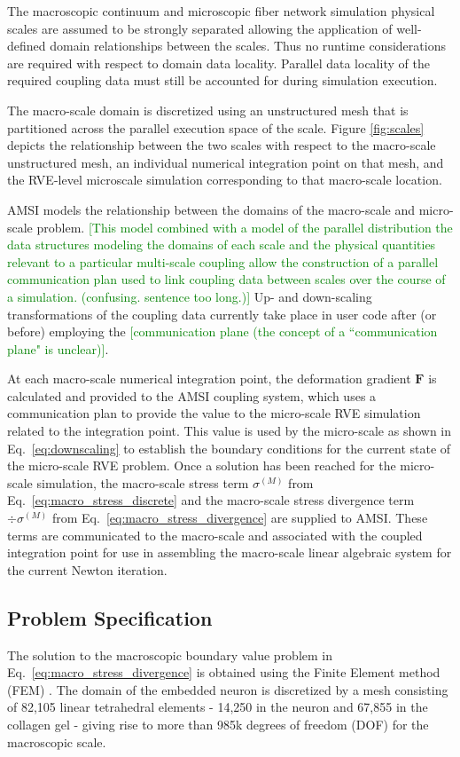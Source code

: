 \documentclass[]{interact}
\newcommand{\green}[1]{\textcolor{green}{[#1]}}
\begin{document}
The macroscopic continuum and microscopic fiber network simulation physical scales are assumed to be strongly separated allowing the application of well-defined domain relationships between the scales. Thus no runtime considerations are required with respect to domain data locality. Parallel data locality of the required coupling data must still be accounted for during simulation execution.

The macro-scale domain is discretized using an unstructured mesh that is partitioned across the parallel execution space of the scale. Figure \ref{fig:scales} depicts the relationship between the two scales with respect to the macro-scale unstructured mesh, an individual numerical integration point on that mesh, and the RVE-level microscale simulation corresponding to that macro-scale location.

AMSI models the relationship between the domains of the macro-scale and micro-scale problem. \green{This model combined with a model of the parallel distribution the data structures modeling the domains of each scale and the physical quantities relevant to a particular multi-scale coupling allow the construction of a parallel communication plan used to link coupling data between scales over the course of a simulation. (confusing. sentence too long.)} Up- and down-scaling transformations of the coupling data currently take place in user code after (or before) employing the \green{communication plane (the concept of a ``communication plane" is unclear)}.

At each macro-scale numerical integration point, the deformation gradient $\pmb{F}$ is calculated and provided to the AMSI coupling system, which uses a communication plan to provide the value to the micro-scale RVE simulation related to the integration point. This value is used by the micro-scale as shown in Eq.\ \eqref{eq:downscaling} to establish the boundary conditions for the current state of the micro-scale RVE problem. Once a solution has been reached for the micro-scale simulation, the macro-scale stress term $\sigma^{(M)}$ from Eq.\ \eqref{eq:macro_stress_discrete} and the macro-scale stress divergence term $\div \sigma^{(M)}$ from Eq.\ \eqref{eq:macro_stress_divergence} are supplied to AMSI. These terms are communicated to the macro-scale and associated with the coupled integration point for use in assembling the macro-scale linear algebraic system for the current Newton iteration.


\subsection{Problem Specification}\label{sec:specification}
The solution to the macroscopic boundary value problem in Eq.\ \eqref{eq:macro_stress_divergence} is obtained using the Finite Element method (FEM) \citep{JavierBonet:2008uxa}. The domain of the embedded neuron is discretized by a mesh consisting of  82,105 linear tetrahedral elements - 14,250 in the neuron and 67,855 in the collagen gel -  giving rise to more than 985k degrees of freedom (DOF) for the macroscopic scale.
\end{document}

